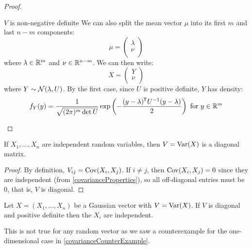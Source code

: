\documentclass[../main.tex]{subfiles}
\begin{document}
\begin{proof}
\begin{proofcases}
\begin{case}{$V$ is non-negative definite}
      We can also split the mean vector $\mu$ into its first $m$ and last $n - m$ components:
      \[
        \mu = \begin{pmatrix}
        \lambda \\
        \nu \\
        \end{pmatrix}
      \]
      where $\lambda \in \mathbb{R}^{m}$ and $\nu \in \mathbb{R}^{n - m}$.
      We can then write:
      \[
        X = \begin{pmatrix}
          Y \\
          \nu \\
        \end{pmatrix}
      \]
      where $Y \sim \operatorname{\mathcal{N}}(\lambda, U)$.
      By the first case, since $U$ is positive definite, $Y$ has density:
      \[
        f_Y(y) = \frac{1}{\sqrt{(2\pi)^{m} \det U}}\exp\left(- \frac{(y - \lambda)^{{\mkern-1.5mu\mathsf{T}}}U^{-1}(y - \lambda)}{2}\right) \text{ for $y \in \mathbb{R}^{m}$}
      \]
    \end{case}
  \end{proofcases}
\end{proof}
\begin{proposition}
  If $X_1, \ldots, X_n$ are independent random variables, then $V = \operatorname{Var}(X)$ is a diagonal matrix.
\end{proposition}
\begin{proof}
  By definition, $V_{ij} = \operatorname{Cov}(X_i, X_j)$.
  If $i \neq j$, then $\operatorname{Cov}(X_i, X_j) = 0$ since they are independent (from \cref{covarianceProperties}), so all off-diagonal entries must be 0, that is, $V$ is diagonal.
\end{proof}
\begin{proposition}
  Let $X = (X_1, \ldots, X_n)$ be a Gaussian vector with $V = \operatorname{Var}(X)$.
  If $V$ is diagonal and positive definite then the $X_i$ are independent. \label{gaussianCov0}
\end{proposition}
\begin{remark}[Warning]
  This is not true for any random vector as we saw a counterexample for the one-dimensional case in \cref{covarianceCounterExample}.
\end{remark}
\end{document}

